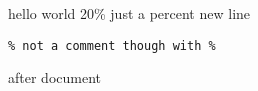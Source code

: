 
hello world
20\% just a percent 
new line \\%
\begin{comment}
comment even without percent %
\end{comment}
\begin{verbatim}
% not a comment though with %
\end{verbatim}

after document
